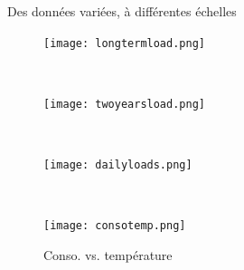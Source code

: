 \begin{frame}{Des données variées, à différentes échelles}

\begin{figure}[!ht] \centering
  \begin{minipage}[c]{0.48\textwidth}
     \texttt{[image: longtermload.png]}
     \vspace*{-0.35cm}
     \caption{Tendance à long terme} %
  \end{minipage}%
  ~ %
  \begin{minipage}[c]{0.48\textwidth}
     \texttt{[image: twoyearsload.png]}
     \vspace*{-0.35cm}
     \caption{Cyclicité semaine} %
  \end{minipage}
  ~\\[-0.05cm]
  \begin{minipage}[c]{0.48\textwidth}
     \texttt{[image: dailyloads.png]}
     \vspace*{-0.35cm}
     \caption{Moyenne journalière} %
  \end{minipage}
  ~ %
  \begin{minipage}[c]{0.48\textwidth}
     \texttt{[image: consotemp.png]}
     \vspace*{-0.35cm}
     \caption{Conso. vs. température}
  \end{minipage}
\end{figure}

\end{frame}

